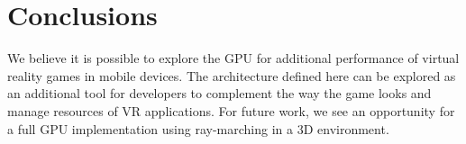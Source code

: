 \documentclass[runningheads]{llncs}
\begin{document}
\section{Conclusions}
We believe it is possible to explore the GPU for additional performance of virtual reality games in mobile devices. The architecture defined here can be explored as an additional tool for developers to complement the way the game looks and manage resources of VR applications. For future work, we see an opportunity for a full GPU implementation using ray-marching in a 3D environment.
%
%
%


\end{document}
